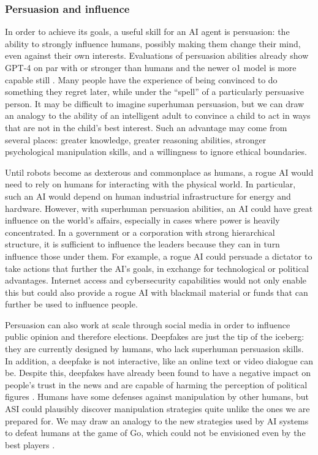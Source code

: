     \subsubsection{Persuasion and influence}
    \label{sec:existential:lossofcontrol:persuasion}

In order to achieve its goals, a useful skill for an AI agent is persuasion: the ability to strongly influence humans, possibly making them change their mind, even against their own interests. Evaluations of persuasion abilities already show GPT-4 on par with or stronger than humans \cite{ojs.aaai.org.index.php.ICWSM.article.view.31304} and the newer o1 model is more capable still \cite{openai.com.index.openai.o1.system.card}. Many people have the experience of being convinced to do something they regret later, while under the ``spell'' of a particularly persuasive person. It may be difficult to imagine superhuman persuasion, but we can draw an analogy to the ability of an intelligent adult to convince a child to act in ways that are not in the child's best interest. Such an advantage may come from several places: greater knowledge, greater reasoning abilities, stronger psychological manipulation skills, and a willingness to ignore ethical boundaries.

Until robots become as dexterous and commonplace as humans, a rogue AI would need to rely on humans for interacting with the physical world. In particular, such an AI would depend on human industrial infrastructure for energy and hardware. However, with superhuman persuasion abilities, an AI could have great influence on the world's affairs, especially in cases where power is heavily concentrated. In a government or a corporation with strong hierarchical structure, it is sufficient to influence the leaders because they can in turn influence those under them. For example, a rogue AI could persuade a dictator to take actions that further the AI's goals, in exchange for technological or political advantages. Internet access and cybersecurity capabilities \cite{arxiv.org.abs.2404.08144} would not only enable this but could also provide a rogue AI with blackmail material or funds that can further be used to influence people.

Persuasion can also work at scale through social media in order to influence public opinion and therefore elections. Deepfakes are just the tip of the iceberg: they are currently designed by humans, who lack superhuman persuasion skills. In addition, a deepfake is not interactive, like an online text or video dialogue can be. Despite this, deepfakes have already been found to have a negative impact on people’s trust in the news and are capable of harming the perception of political figures \cite{journals.sagepub.com.doi.10.1177.2056305120903408,www.sciencedirect.com.science.article.pii.S0747563223004478}. Humans have some defenses against manipulation by other humans, but ASI could plausibly discover manipulation strategies quite unlike the ones we are prepared for. We may draw an analogy to the new strategies used by AI systems to defeat humans at the game of Go, which could not be envisioned even by the best players \cite{www.wired.com.2016.03.two.moves.alphago.lee.sedol.redefined.future}. 

